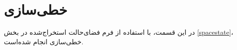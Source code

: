 \section{خطی‌سازی}\label{lin_SISO}
در این قسمت، با استفاده از فرم فضای‌حالت استخراج‌شده در بخش 
\ref{spacestate}،
 خطی‌سازی انجام شده‌‌است. 
